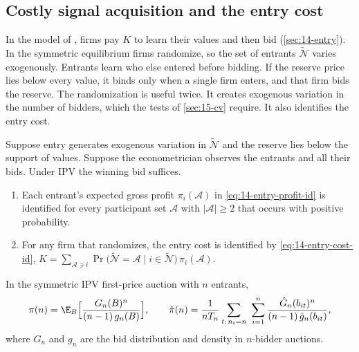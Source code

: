 \subsection{Costly signal acquisition and the entry cost}\label{sec:15-entry-cost}

In the model of \citet{LevinSmith1994}, firms pay $K$ to learn their values and then bid
(\cref{sec:14-entry}). In the symmetric equilibrium firms randomize, so the set of entrants
$\tilde{\mathcal N}$ varies exogenously. Entrants learn who else entered before bidding. If the reserve
price lies below every value, it binds only when a single firm enters, and that firm bids the reserve.
The randomization is useful twice. It creates exogenous variation in the number of bidders, which the
tests of \cref{sec:15-cv} require. It also identifies the entry cost.

\begin{proposition}\label{prop:15-entry-ident}
Suppose entry generates exogenous variation in $\tilde{\mathcal N}$ and the reserve lies below the
support of values. Suppose the econometrician observes the entrants and all their bids. Under IPV the
winning bid suffices.
\begin{enumerate}[label=(\roman*)]
\item Each entrant's expected gross profit $\pi_i(\mathcal A)$ in \eqref{eq:14-entry-profit-id} is
identified for every participant set $\mathcal A$ with $|\mathcal A|\ge2$ that occurs with positive
probability.
\item For any firm that randomizes, the entry cost is identified by \eqref{eq:14-entry-cost-id},
$K=\sum_{\mathcal A\ni i}\Pr\big(\tilde{\mathcal N}=\mathcal A\mid i\in\tilde{\mathcal N}\big)\,\pi_i(\mathcal A)$.
\end{enumerate}
In the symmetric IPV first-price auction with $n$ entrants,
\begin{equation}\label{eq:15-entry-profit}
\pi(n)=\E_B\Big[\frac{G_n(B)^n}{(n-1)\,g_n(B)}\Big],\qquad
\hat\pi(n)=\frac{1}{nT_n}\sum_{t:\,n_t=n}\ \sum_{i=1}^{n}\frac{\hat G_n(b_{it})^n}{(n-1)\,\hat g_n(b_{it})},
\end{equation}
where $G_n$ and $g_n$ are the bid distribution and density in $n$-bidder auctions.
\end{proposition}

